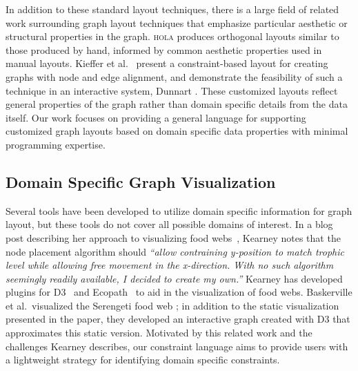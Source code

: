 In addition to these standard layout techniques, there is a large field of
related work surrounding graph layout techniques that emphasize particular
aesthetic or structural properties in the graph. \textsc{hola}
\cite{kieffer2016hola} produces orthogonal layouts similar
to those produced by hand, informed by common aesthetic properties used in manual layouts. Kieffer et al.~\cite{kieffer2013incremental} present
a constraint-based layout for creating graphs with node and edge alignment,
and demonstrate the feasibility of such a technique in an interactive
system, Dunnart \cite{dwyer2008dunnart}.
These customized layouts reflect
general properties of the graph rather than domain specific details from
the data itself.  Our work focuses on providing a general language for
supporting customized graph layouts based on domain specific data
properties with minimal programming expertise.


\subsection{Domain Specific Graph Visualization}
 Several tools have been developed to utilize
domain specific information for graph layout, but these tools do not cover
all possible domains of interest. In a blog post describing her approach to
visualizing food webs~\cite{kearney2016blog}, Kearney notes that the node
placement algorithm should \emph{``allow contraining y-position to match
  trophic level while allowing free movement in the x-direction. With no
  such algorithm seemingly readily available, I decided to create my
  own.''} Kearney has developed plugins for D3~\cite{kearney2017d3} and
Ecopath~\cite{kearney2017ecopath} to aid in the visualization of
food webs. Baskerville et al.\ visualized the Serengeti food web
\cite{baskerville2011spatial}; in addition to the static visualization
presented in the paper, they developed an interactive graph
\cite{baskerville2011interactive} created with D3 that approximates this
static version.  Motivated by this related work and the
challenges Kearney describes, our constraint language aims to provide users
with a lightweight strategy for identifying domain specific constraints.

